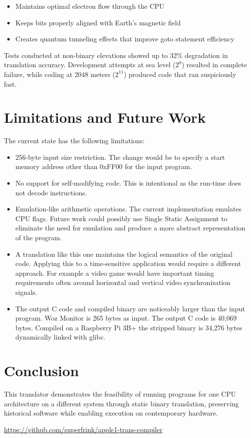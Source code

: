 \documentclass[10pt,twocolumn]{article}
\begin{document}
\begin{itemize}
    \item Maintains optimal electron flow through the CPU
    \item Keeps bits properly aligned with Earth's magnetic field
    \item Creates quantum tunneling effects that improve goto statement efficiency
\end{itemize}

Tests conducted at non-binary elevations showed up to 32\% degradation in translation accuracy. Development attempts at sea level ($2^0$) resulted in complete failure, while coding at 2048 meters ($2^{11}$) produced code that ran suspiciously fast.

\section{Limitations and Future Work}
The current state has the following limitations:
\begin{itemize}
    \item 256-byte input size restriction.  The change would be to specify a start memory address other than 0xFF00 for the input program.
    \item No support for self-modifying code.  This is intentional as the run-time does not decode instructions.
    \item Emulation-like arithmetic operations.  The current implementation emulates CPU flags.  Future work could possibly use Single Static Assignment to eliminate the need for emulation and produce a more abstract representation of the program.
    \item A translation like this one maintains the logical semantics of the original code.  Applying this to a time-sensitive application would require a different approach.  For example a video game would have important timing requirements often around horizontal and vertical video synchronization signals.
    \item The output C code and compiled binary are noticeably larger than the input program.  Woz Monitor is 265 bytes as input.  The output C code is 40,069 bytes.  Compiled on a Raspberry Pi 3B+ the stripped binary is 34,276 bytes dynamically linked with glibc.
\end{itemize}

\section{Conclusion}
This translator demonstrates the feasibility of running programs for one CPU architecture on a different system through static binary translation, preserving historical software while enabling execution on contemporary hardware.

\begin{thebibliography}{1}
     \url{https://github.com/superfrink/apple1-trans-compiler}
\end{thebibliography}
    
\end{document}
